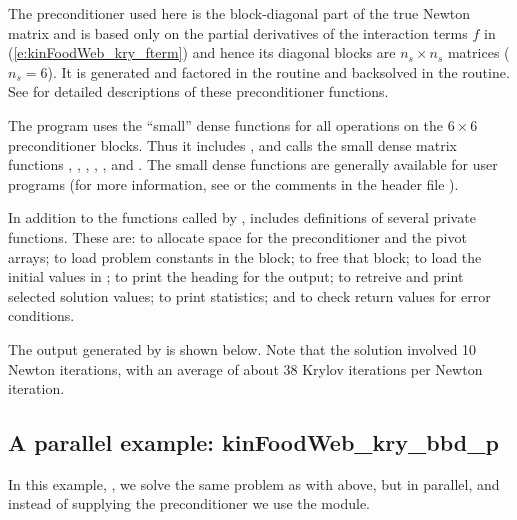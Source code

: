 The preconditioner used here is the block-diagonal part of the true Newton
matrix and is based only on the partial derivatives of the interaction terms $f$
in (\ref{e:kinFoodWeb_kry_fterm}) and hence its  diagonal blocks are $n_s \times n_s$ matrices
($n_s = 6$).
It is generated and factored in the  routine and
backsolved in the  routine.  
See  for detailed descriptions
of these preconditioner functions.

The program  uses the ``small'' dense functions for all operations 
on the $6 \times 6$ preconditioner blocks.  
Thus it includes , and calls the small dense matrix
functions , , 
, , , and .
The small dense functions are generally available for {\kinsol} user programs
(for more information, see  or the comments in the header file
).

In addition to the functions called by {\kinsol},  includes
definitions of several private functions.  These are: 
to allocate space for the preconditioner and the pivot arrays; 
to load problem constants in the  block;  to free
that block;  to load the initial values in ;
 to print the heading for the output;
 to retreive and print selected solution values;
 to print statistics; and 
to check return values for error conditions.

The output generated by  is shown below.  Note that the
solution involved 10 Newton iterations, with an average of about 38
Krylov iterations per Newton iteration.



\subsection{A parallel example: kinFoodWeb\_kry\_bbd\_p}\label{ss:kinFoodWeb_kry_bbd_p}

In this example, , we solve the same
problem as with  above, but in parallel, and
instead of supplying the preconditioner we use the {\kinbbdpre} module.  

